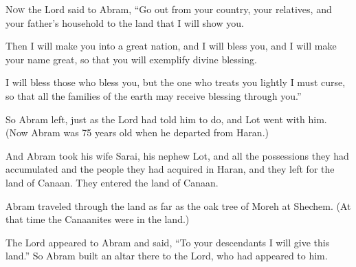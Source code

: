 \begin{scripture}
 \allowchapbreak\hypertarget{ch-genesis-12}{}\lettrine[lines=5]{\color{pentateuch}N}{\textsc{ow}} the Lord said to Abram, ``Go out from your country, your relatives, and your father's household to the land that I will show you.\everypar{}
\\\indent{} Then I will make you into a great nation, and I will bless you, and I will make your name great, so that you will exemplify divine blessing.
\everypar{}

 I will bless those who bless you, but the one who treats you lightly I must curse, so that all the families of the earth may receive blessing through you.''
\everypar{}

 So Abram left, just as the Lord had told him to do, and Lot went with him. (Now Abram was 75 years old when he departed from Haran.)
 And Abram took his wife Sarai, his nephew Lot, and all the possessions they had accumulated and the people they had acquired in Haran, and they left for the land of Canaan. They entered the land of Canaan.
\everypar{}

 Abram traveled through the land as far as the oak tree of Moreh at Shechem. (At that time the Canaanites were in the land.)
 The Lord appeared to Abram and said, ``To your descendants I will give this land.'' So Abram built an altar there to the Lord, who had appeared to him.
\everypar{}


\end{scripture}
